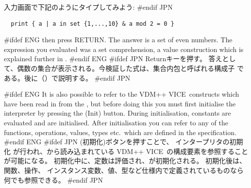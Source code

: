 \documentclass[\pformat,12pt]{article}
\newcommand{\vdmslpp}{VDM-SL}
\newcommand{\vdmslpp}{VDM++}
\renewcommand{\vdmslpp}{VDM++ VICE}
\newcommand{\guicmd}[1]{{\sf #1}}
\newcommand{\guicmd}[1]{{\gt #1}}
\begin{document}
入力画面で下記のようにタイプしてみよう:
#endif JPN

\begin{verbatim}
  print { a | a in set {1,...,10} & a mod 2 = 0 }
\end{verbatim}

#ifdef ENG
then press RETURN.  The answer is a set of even
numbers. The expression you evaluated was a set comprehension, a value
construction which is explained further in
.
#endif ENG
#ifdef JPN
Returnキーを押す。
答えとして、偶数の集合が表示される。今検証した式は、集合内包と呼ばれる構成子
である。後に（）で説明する。
#endif JPN

#ifdef ENG
It is also possible to refer to the \vdmslpp\ constructs which have
been read in from the 
, but before doing this you must first
initialise the 
interpreter by pressing the 
(\guicmd{Init}) button. 
During initialisation, constants are 
evaluated and  are initialised. 
After initialisation you can refer to any of the functions,
operations, 
values, types etc.\ which are defined in the
 specification.
#endif ENG
#ifdef JPN
(\guicmd{初期化})ボタンを押すことで、 インタープリタの初期化
が行われ、から読み込まれている
\vdmslpp\ の構成要素を参照することが可能になる。
初期化中に、定数は評価され、が初期化される。
初期化後は、関数、操作、
インスタンス変数、値、型など仕様内で定義されているものなら
何でも参照できる。 
#endif JPN
\end{document}
